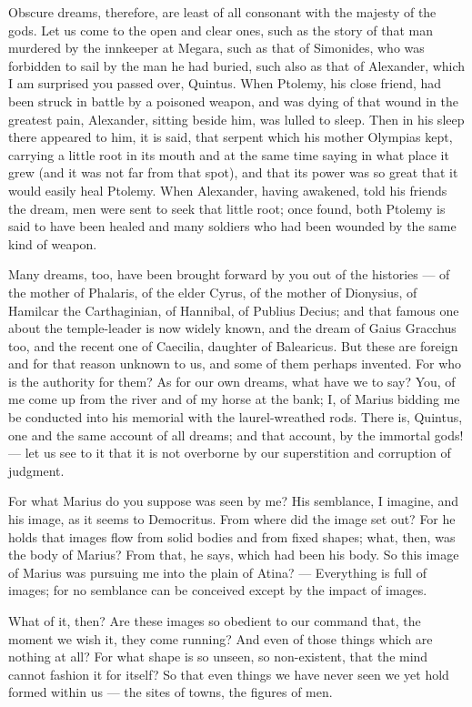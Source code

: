  Obscure dreams, therefore, are least of all consonant with the majesty of the gods. Let us come to the open and clear ones, such as the story of that man murdered by the innkeeper at Megara, such as that of Simonides, who was forbidden to sail by the man he had buried, such also as that of Alexander, which I am surprised you passed over, Quintus. When Ptolemy, his close friend, had been struck in battle by a poisoned weapon, and was dying of that wound in the greatest pain, Alexander, sitting beside him, was lulled to sleep. Then in his sleep there appeared to him, it is said, that serpent which his mother Olympias kept, carrying a little root in its mouth and at the same time saying in what place it grew (and it was not far from that spot), and that its power was so great that it would easily heal Ptolemy. When Alexander, having awakened, told his friends the dream, men were sent to seek that little root; once found, both Ptolemy is said to have been healed and many soldiers who had been wounded by the same kind of weapon.

 Many dreams, too, have been brought forward by you out of the histories — of the mother of Phalaris, of the elder Cyrus, of the mother of Dionysius, of Hamilcar the Carthaginian, of Hannibal, of Publius Decius; and that famous one about the temple-leader is now widely known, and the dream of Gaius Gracchus too, and the recent one of Caecilia, daughter of Balearicus. But these are foreign and for that reason unknown to us, and some of them perhaps invented. For who is the authority for them? As for our own dreams, what have we to say? You, of me come up from the river and of my horse at the bank; I, of Marius bidding me be conducted into his memorial with the laurel-wreathed rods. There is, Quintus, one and the same account of all dreams; and that account, by the immortal gods! — let us see to it that it is not overborne by our superstition and corruption of judgment.

 For what Marius do you suppose was seen by me? His semblance, I imagine, and his image, as it seems to Democritus. From where did the image set out? For he holds that images flow from solid bodies and from fixed shapes; what, then, was the body of Marius? From that, he says, which had been his body. So this image of Marius was pursuing me into the plain of Atina? — Everything is full of images; for no semblance can be conceived except by the impact of images.

 What of it, then? Are these images so obedient to our command that, the moment we wish it, they come running? And even of those things which are nothing at all? For what shape is so unseen, so non-existent, that the mind cannot fashion it for itself? So that even things we have never seen we yet hold formed within us — the sites of towns, the figures of men.

